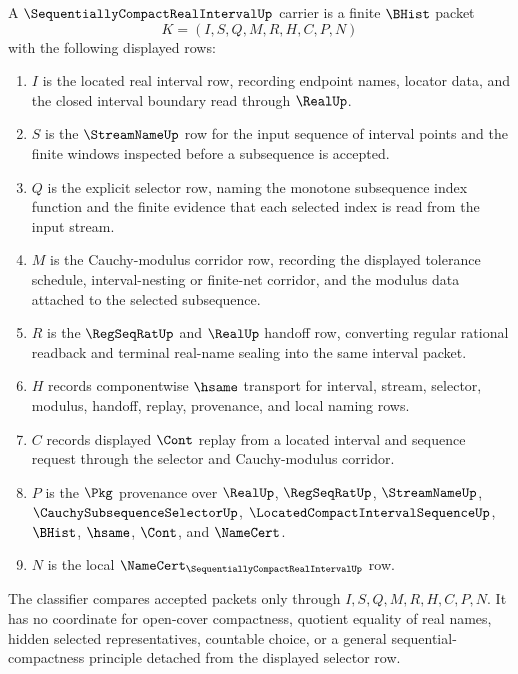 \begin{definition}
\label{def:sequentially-compact-real-interval-carrier}
A $\SequentiallyCompactRealIntervalUp$ carrier is a finite $\BHist$ packet
$$
K=(I,S,Q,M,R,H,C,P,N)
$$
with the following displayed rows:
\begin{enumerate}
\item $I$ is the located real interval row, recording endpoint names, locator data, and the closed interval boundary read through $\RealUp$.
\item $S$ is the $\StreamNameUp$ row for the input sequence of interval points and the finite windows inspected before a subsequence is accepted.
\item $Q$ is the explicit selector row, naming the monotone subsequence index function and the finite evidence that each selected index is read from the input stream.
\item $M$ is the Cauchy-modulus corridor row, recording the displayed tolerance schedule, interval-nesting or finite-net corridor, and the modulus data attached to the selected subsequence.
\item $R$ is the $\RegSeqRatUp$ and $\RealUp$ handoff row, converting regular rational readback and terminal real-name sealing into the same interval packet.
\item $H$ records componentwise $\hsame$ transport for interval, stream, selector, modulus, handoff, replay, provenance, and local naming rows.
\item $C$ records displayed $\Cont$ replay from a located interval and sequence request through the selector and Cauchy-modulus corridor.
\item $P$ is the $\Pkg$ provenance over $\RealUp$, $\RegSeqRatUp$, $\StreamNameUp$, $\CauchySubsequenceSelectorUp$, $\LocatedCompactIntervalSequenceUp$, $\BHist$, $\hsame$, $\Cont$, and $\NameCert$.
\item $N$ is the local $\NameCert_{\SequentiallyCompactRealIntervalUp}$ row.
\end{enumerate}
The classifier compares accepted packets only through $I,S,Q,M,R,H,C,P,N$. It has no coordinate for open-cover compactness, quotient equality of real names, hidden selected representatives, countable choice, or a general sequential-compactness principle detached from the displayed selector row.
\end{definition}


